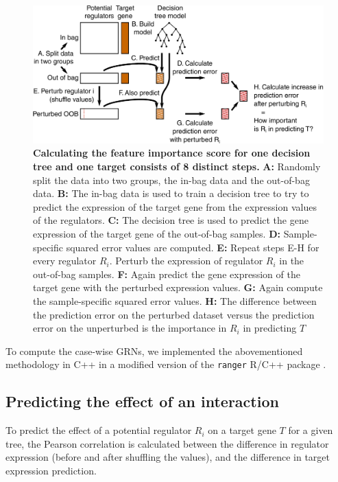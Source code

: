 \begin{figure}[htb!]
	\centering
	\includegraphics[width=.9\linewidth]{fig/methodology/fimp.pdf} 
	\caption{
		\textbf{Calculating the feature importance score for one decision tree and one target consists of 8 distinct steps.}
		\textbf{A:} Randomly split the data into two groups, the in-bag data and the out-of-bag data.
		\textbf{B:} The in-bag data is used to train a decision tree to try to predict the expression of the target gene from the expression values of the regulators.
		\textbf{C:} The decision tree is used to predict the gene expression of the target gene of the out-of-bag samples.
		\textbf{D:} Sample-specific squared error values are computed.
		\textbf{E:} Repeat steps E-H for every regulator $R_i$. Perturb the expression of regulator $R_i$ in the out-of-bag samples.
		\textbf{F:} Again predict the gene expression of the target gene with the perturbed expression values.
		\textbf{G:} Again compute the sample-specific squared error values.
		\textbf{H:} The difference between the prediction error on the perturbed dataset versus the prediction error on the unperturbed is the importance in $R_i$ in predicting $T$ 
	}
	\label{fig:fimp}
\end{figure}

To compute the case-wise GRNs, we implemented the abovementioned methodology in C++ in a modified version of the \texttt{ranger} R/C++ package \cite{wright_rangerfastimplementation_2017}.

\subsection{Predicting the effect of an interaction}
To predict the effect of a potential regulator $R_i$ on a target gene $T$ for a given tree, the Pearson correlation is calculated between the difference in regulator expression (before and after shuffling the values), and the difference in target expression prediction. 

